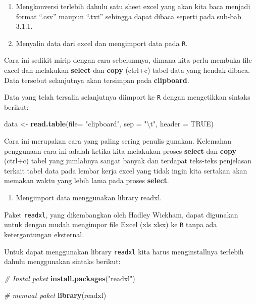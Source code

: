 \documentclass[]{book}
\newenvironment{Shaded}{\begin{snugshade}}{\end{snugshade}}
\newcommand{\KeywordTok}[1]{\textcolor[rgb]{0.13,0.29,0.53}{\textbf{#1}}}
\newcommand{\DataTypeTok}[1]{\textcolor[rgb]{0.13,0.29,0.53}{#1}}
\newcommand{\CharTok}[1]{\textcolor[rgb]{0.31,0.60,0.02}{#1}}
\newcommand{\StringTok}[1]{\textcolor[rgb]{0.31,0.60,0.02}{#1}}
\newcommand{\CommentTok}[1]{\textcolor[rgb]{0.56,0.35,0.01}{\textit{#1}}}
\newcommand{\OtherTok}[1]{\textcolor[rgb]{0.56,0.35,0.01}{#1}}
\newcommand{\NormalTok}[1]{#1}
\providecommand{\tightlist}{%
  \setlength{\itemsep}{0pt}\setlength{\parskip}{0pt}}
\begin{document}
\begin{enumerate}
\def\labelenumi{\alph{enumi}.}
\item
  Mengkonversi terlebih dahulu satu sheet excel yang akan kita baca
  menjadi format ``.csv'' maupun ``.txt'' sehingga dapat dibaca seperti
  pada sub-bab 3.1.1.
\item
  Menyalin data dari excel dan mengimport data pada \texttt{R}.
\end{enumerate}

Cara ini sedikit mirip dengan cara sebelumnya, dimana kita perlu membuka
file excel dan melakukan \textbf{select} dan \textbf{copy} (ctrl+c)
tabel data yang hendak dibaca. Data tersebut selanjutnya akan tersimpan
pada \textbf{clipboard}.

Data yang telah tersalin selanjutnya diimport ke \texttt{R} dengan
mengetikkan sintaks berikut:

\begin{Shaded}
\begin{Highlighting}[]
\NormalTok{data <-}\StringTok{ }\KeywordTok{read.table}\NormalTok{(}\DataTypeTok{file=} \StringTok{"clipboard"}\NormalTok{,}
                   \DataTypeTok{sep =} \StringTok{"}\CharTok{\textbackslash{}t}\StringTok{"}\NormalTok{, }\DataTypeTok{header =} \OtherTok{TRUE}\NormalTok{)}
\end{Highlighting}
\end{Shaded}

Cara ini merupakan cara yang paling sering penulis gunakan. Kelemahan
penggunaan cara ini adalah ketika kita melakukan proses \textbf{select}
dan \textbf{copy} (ctrl+c) tabel yang jumlahnya sangat banyak dan
terdapat teks-teks penjelasan terkait tabel data pada lembar kerja excel
yang tidak ingin kita sertakan akan memakan waktu yang lebih lama pada
proses \textbf{select}.

\begin{enumerate}
\def\labelenumi{\alph{enumi}.}
\setcounter{enumi}{2}
\tightlist
\item
  Mengimport data menggunakan library readxl.
\end{enumerate}

Paket \texttt{readxl}, yang dikembangkan oleh Hadley Wickham, dapat
digunakan untuk dengan mudah mengimpor file Excel (xls \textbar{} xlsx)
ke \texttt{R} tanpa ada ketergantungan eksternal.

Untuk dapat menggunakan library \texttt{readxl} kita harus
menginstallnya terlebih dahulu menggunakan sintaks berikut:

\begin{Shaded}
\begin{Highlighting}[]
\CommentTok{# Instal paket}
\KeywordTok{install.packages}\NormalTok{(}\StringTok{"readxl"}\NormalTok{)}

\CommentTok{# memuat paket}
\KeywordTok{library}\NormalTok{(readxl)}
\end{Highlighting}
\end{Shaded}
\end{document}
